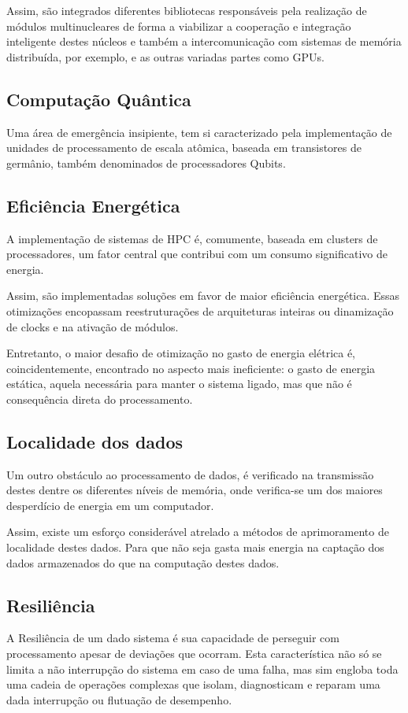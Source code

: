 \documentclass{article}
\begin{document}
Assim, são integrados diferentes bibliotecas responsáveis pela realização de módulos multinucleares de forma a viabilizar a cooperação e integração inteligente destes núcleos e também a intercomunicação com sistemas de memória distribuída, por exemplo, e as outras variadas partes como GPUs.

\subsection*{Computação Quântica}
Uma área de emergência insipiente, tem si caracterizado pela implementação de unidades de processamento de escala atômica, baseada em transistores de germânio, também denominados de processadores Qubits.

\subsection*{Eficiência Energética}
A implementação de sistemas de HPC é, comumente, baseada em clusters de processadores, um fator central que contribui com um consumo significativo de energia.

Assim, são implementadas soluções em favor de maior eficiência energética. Essas otimizações encopassam 
reestruturações de arquiteturas inteiras ou dinamização de clocks e na ativação de módulos. 

Entretanto, o maior desafio de otimização no gasto de energia elétrica é, coincidentemente, encontrado no aspecto mais ineficiente: o gasto de energia estática, aquela necessária para manter o sistema ligado, mas que não é consequência direta do processamento.   

\subsection*{Localidade dos dados}
Um outro obstáculo ao processamento de dados, é verificado na transmissão destes dentre os diferentes níveis de memória, onde verifica-se um dos maiores desperdício de energia em um computador. 

Assim, existe um esforço considerável atrelado a métodos de aprimoramento de localidade destes dados. Para que não seja gasta mais energia na captação dos dados armazenados do que na computação destes dados.

\subsection*{Resiliência}
A Resiliência de um dado sistema é sua capacidade de perseguir com processamento apesar de deviações que ocorram. Esta característica não só se limita a não interrupção do sistema em caso de uma falha, mas sim engloba toda uma cadeia de operações complexas que isolam, diagnosticam e reparam uma dada interrupção ou flutuação de desempenho.
\end{document}
